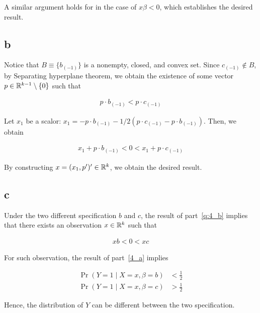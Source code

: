 \documentclass[11pt]{article}
\begin{document}
A similar argument holds for in the case of $x\beta < 0$, which establishes the desired result.

\subsection*{b}\label{q:4_b}

Notice that $B \equiv \{b_{(-1)}\}$ is a nonempty, closed, and convex set. Since $c_{(-1)} \notin B$, by Separating hyperplane theorem, we obtain the existence of some vector $p \in \mathbb{R}^{k-1}\setminus \{0\}$ such that

\begin{align*}
    p \cdot b_{(-1)} < p \cdot c_{(-1)}
\end{align*}

Let $x_1$ be a scalor: $x_1 = - p \cdot b_{(-1)} - 1/2 (p\cdot c_{(-1)} - p \cdot b_{(-1)})$. Then, we obtain

\begin{align*}
    x_1 + p \cdot b_{(-1)} < 0 < x_1 + p \cdot c_{(-1)}
\end{align*}

By constructing $x = (x_1, p^\prime)^\prime \in \mathbb{R}^k$, we obtain the desired result.

\subsection*{c}

Under the two different specification $b$ and $c$, the result of part~\ref{q:4_b} implies that there exists an observation $x \in \mathbb{R}^k$ such that

\begin{align*}
    xb < 0 < xc
\end{align*}

For such observation, the result of part~\ref{4_a} implies

\begin{align*}
    \Pr(Y = 1 \mid X = x, \beta = b) &< \frac{1}{2} \\
    \Pr(Y = 1 \mid X = x, \beta = c) &> \frac{1}{2}
\end{align*}

Hence, the distribution of $Y$ can be different between the two specification.
\end{document}
